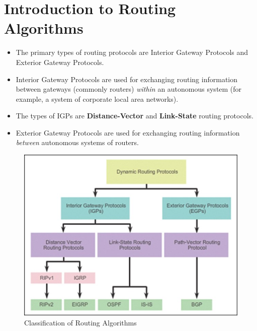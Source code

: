 \documentclass[a4paper]{article}
\theoremstyle{plain}
\theoremstyle{definition}
\begin{document}
\section{Introduction to Routing Algorithms}
\begin{itemize}
    \item The primary types of routing protocols are Interior Gateway Protocols and Exterior Gateway Protocols. 
    
    \item Interior Gateway Protocols are used for exchanging routing information between gateways (commonly routers) \textit{within} an autonomous system (for example, a system of corporate local area networks). 
    
    \item The types of IGPs are \textbf{Distance-Vector} and \textbf{Link-State} routing protocols. 
    
    \item Exterior Gateway Protocols are used for exchanging routing information \textit{between} autonomous systems of routers. 
    
\end{itemize}

\begin{figure}[!h]
    \centering
    \includegraphics[scale=0.6]{cn15.jpg}
    \caption{Classification of Routing Algorithms}
    \label{fig:my_label_15}
\end{figure}

\break 
\end{document}
